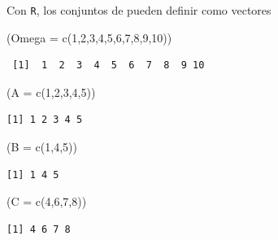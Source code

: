 \documentclass[
  letterpaper,
  DIV=11,
  numbers=noendperiod]{scrreprt}
\newenvironment{Shaded}{\begin{snugshade}}{\end{snugshade}}
\newcommand{\AttributeTok}[1]{\textcolor[rgb]{0.40,0.45,0.13}{#1}}
\newcommand{\DecValTok}[1]{\textcolor[rgb]{0.68,0.00,0.00}{#1}}
\newcommand{\FunctionTok}[1]{\textcolor[rgb]{0.28,0.35,0.67}{#1}}
\newcommand{\NormalTok}[1]{\textcolor[rgb]{0.00,0.23,0.31}{#1}}
\begin{document}
Con \texttt{R}, los conjuntos de pueden definir como vectores

\begin{Shaded}
\begin{Highlighting}[]
\NormalTok{(}\AttributeTok{Omega =} \FunctionTok{c}\NormalTok{(}\DecValTok{1}\NormalTok{,}\DecValTok{2}\NormalTok{,}\DecValTok{3}\NormalTok{,}\DecValTok{4}\NormalTok{,}\DecValTok{5}\NormalTok{,}\DecValTok{6}\NormalTok{,}\DecValTok{7}\NormalTok{,}\DecValTok{8}\NormalTok{,}\DecValTok{9}\NormalTok{,}\DecValTok{10}\NormalTok{))}
\end{Highlighting}
\end{Shaded}

\begin{verbatim}
 [1]  1  2  3  4  5  6  7  8  9 10
\end{verbatim}

\begin{Shaded}
\begin{Highlighting}[]
\NormalTok{(}\AttributeTok{A =} \FunctionTok{c}\NormalTok{(}\DecValTok{1}\NormalTok{,}\DecValTok{2}\NormalTok{,}\DecValTok{3}\NormalTok{,}\DecValTok{4}\NormalTok{,}\DecValTok{5}\NormalTok{))}
\end{Highlighting}
\end{Shaded}

\begin{verbatim}
[1] 1 2 3 4 5
\end{verbatim}

\begin{Shaded}
\begin{Highlighting}[]
\NormalTok{(}\AttributeTok{B =} \FunctionTok{c}\NormalTok{(}\DecValTok{1}\NormalTok{,}\DecValTok{4}\NormalTok{,}\DecValTok{5}\NormalTok{))}
\end{Highlighting}
\end{Shaded}

\begin{verbatim}
[1] 1 4 5
\end{verbatim}

\begin{Shaded}
\begin{Highlighting}[]
\NormalTok{(}\AttributeTok{C =} \FunctionTok{c}\NormalTok{(}\DecValTok{4}\NormalTok{,}\DecValTok{6}\NormalTok{,}\DecValTok{7}\NormalTok{,}\DecValTok{8}\NormalTok{))}
\end{Highlighting}
\end{Shaded}

\begin{verbatim}
[1] 4 6 7 8
\end{verbatim}
\end{document}

